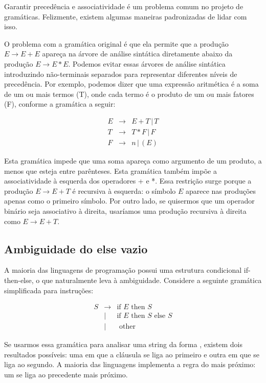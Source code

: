   Garantir precedência e associatividade é um problema comum no projeto
  de gramáticas. Felizmente, existem algumas maneiras padronizadas de
  lidar com isso.

  O problema com a gramática original é que ela permite que a produção
  \(E \to E + E\) apareça na árvore de análise sintática diretamente
  abaixo da produção \(E \to E * E\). Podemos evitar essas árvores de
  análise sintática introduzindo não-terminais separados para
  representar diferentes níveis de precedência. Por exemplo, podemos
  dizer que uma expressão aritmética é a soma de um ou mais termos (T),
  onde cada termo é o produto de um ou mais fatores (F), conforme a
  gramática a seguir:

  \[
    \begin{array}{lcl}
      E & \to & E + T \,|\, T\\
      T & \to & T * F \,|\, F\\
      F & \to & n \,|\, (E)
    \end{array}
  \]

  Esta gramática impede que uma soma apareça como argumento de um
  produto, a menos que esteja entre parênteses. Esta gramática também
  impõe a associatividade à esquerda dos operadores + e *. Essa
  restrição surge porque a produção \(E \to E + T\) é recursiva à
  esquerda: o símbolo \(E\) aparece nas produções apenas como o
  primeiro símbolo. Por outro lado, se quisermos que um operador
  binário seja associativo à direita, usaríamos uma produção recursiva
  à direita como \(E \to E + T\).

  \subsection{Ambiguidade do else vazio}

  A maioria das linguagens de programação possui uma estrutura
  condicional if-then-else, o que
  naturalmente leva à ambiguidade. Considere a seguinte gramática
  simplificada para instruções:

  \[
    \begin{array}{lcl}
      S & \to  & \textrm{if } E \textrm{ then } S\\
      & \mid & \textrm{if } E \textrm{ then } S \textrm{ else } S \\
      & \mid & \textrm{ other }
    \end{array}
  \]

  Se usarmos essa gramática para analisar uma string da forma
  , existem
  dois resultados possíveis: uma em que a cláusula
   se liga ao primeiro
   e outra em que se liga ao segundo. A
  maioria das linguagens implementa a regra do
   mais próximo: um
   se liga ao
   precedente mais próximo.

